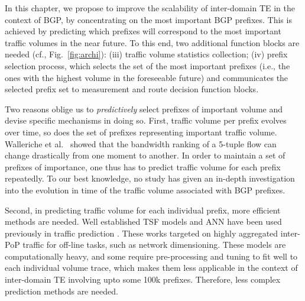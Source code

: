 In this chapter, we propose to improve the scalability of inter-domain TE in the context of BGP, by concentrating on the most important BGP prefixes. 
This is achieved by predicting which prefixes will correspond to the most important traffic volumes in the near future.  
To this end, two additional function blocks are needed (cf., Fig.~\ref{fig:archi}): (iii) traffic volume statistics collection; (iv) prefix selection process, which selects the set of the most important prefixes (i.e., the ones with the highest volume in the foreseeable future) and communicates the selected prefix set to measurement and route decision function blocks.

Two reasons oblige us to \textit{predictively} select prefixes of important volume and devise specific mechanisms in doing so.
First, traffic volume per prefix evolves over time, so does the set of prefixes representing important traffic volume. Walleriche et al.~\cite{Wallerich2006} showed that the bandwidth ranking of a 5-tuple flow can change drastically from one moment to another.
In order to maintain a set of prefixes of importance, one thus has to predict traffic volume for each prefix repeatedly.
To our best knowledge, no study has given an in-depth investigation into the evolution in time of the traffic volume associated with BGP prefixes.

Second, in predicting traffic volume for each individual prefix, more efficient methods are needed.
Well established \acf{TSF} models and \acf{ANN} have been used previously in traffic prediction \cite{Papagiannaki2005, Cortez2006, Otoshi2013}.
These works targeted on highly aggregated inter-\acf{PoP} traffic for off-line tasks, such as network dimensioning.
These models are computationally heavy, and some require pre-processing and tuning to fit well to each individual volume trace, which makes them less applicable in the context of inter-domain TE involving upto some 100k prefixes. Therefore, less complex prediction methods are needed. 

